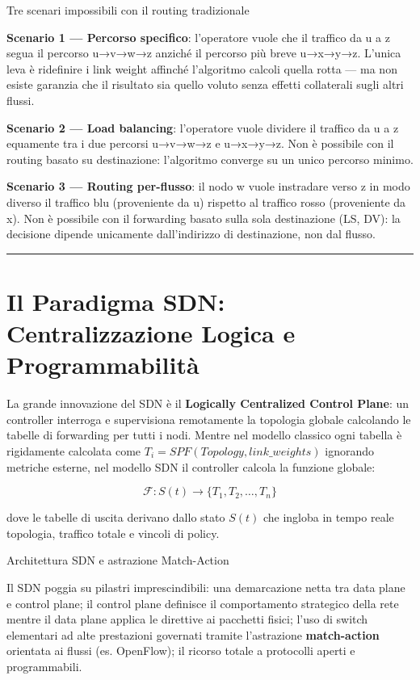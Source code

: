 \documentclass[
  italian,
  openany]{book}
\begin{document}
\begin{callouttip}{Tre scenari impossibili con il routing tradizionale}

\textbf{Scenario 1 --- Percorso specifico}: l'operatore vuole che il
traffico da u a z segua il percorso u→v→w→z anziché il percorso più
breve u→x→y→z. L'unica leva è ridefinire i link weight affinché
l'algoritmo calcoli quella rotta --- ma non esiste garanzia che il
risultato sia quello voluto senza effetti collaterali sugli altri
flussi.

\textbf{Scenario 2 --- Load balancing}: l'operatore vuole dividere il
traffico da u a z equamente tra i due percorsi u→v→w→z e u→x→y→z. Non è
possibile con il routing basato su destinazione: l'algoritmo converge su
un unico percorso minimo.

\textbf{Scenario 3 --- Routing per-flusso}: il nodo w vuole instradare
verso z in modo diverso il traffico blu (proveniente da u) rispetto al
traffico rosso (proveniente da x). Non è possibile con il forwarding
basato sulla sola destinazione (LS, DV): la decisione dipende unicamente
dall'indirizzo di destinazione, non dal flusso.

\end{callouttip}

\begin{center}\rule{0.5\linewidth}{0.5pt}\end{center}

\section{Il Paradigma SDN: Centralizzazione Logica e
Programmabilità}\label{il-paradigma-sdn-centralizzazione-logica-e-programmabilituxe0}

La grande innovazione del SDN è il \textbf{Logically Centralized Control
Plane}: un controller interroga e supervisiona remotamente la topologia
globale calcolando le tabelle di forwarding per tutti i nodi. Mentre nel
modello classico ogni tabella è rigidamente calcolata come
\(T_{i} = SPF(Topology, link\_weights)\) ignorando metriche esterne, nel
modello SDN il controller calcola la funzione globale:

\[
\mathcal{F}: S(t) \rightarrow \{T_1, T_2, \ldots, T_n\}
\]

dove le tabelle di uscita derivano dallo stato \(S(t)\) che ingloba in
tempo reale topologia, traffico totale e vincoli di policy.

\begin{calloutimportant}{Architettura SDN e astrazione Match-Action}

Il SDN poggia su pilastri imprescindibili: una demarcazione netta tra
data plane e control plane; il control plane definisce il comportamento
strategico della rete mentre il data plane applica le direttive ai
pacchetti fisici; l'uso di switch elementari ad alte prestazioni
governati tramite l'astrazione \textbf{match-action} orientata ai flussi
(es. OpenFlow); il ricorso totale a protocolli aperti e programmabili.

\end{calloutimportant}
\end{document}
